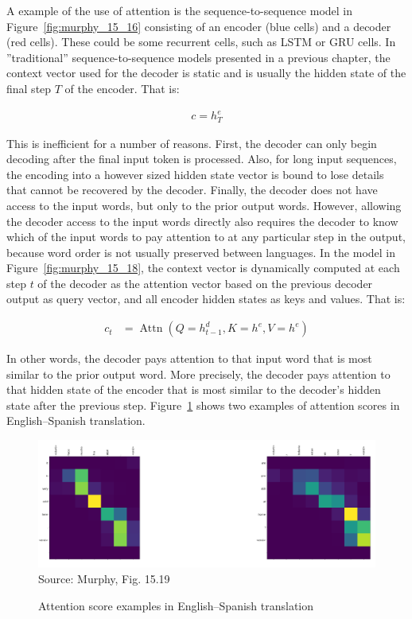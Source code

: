 A example of the use of attention is the sequence-to-sequence model in Figure~\ref{fig:murphy_15_16} consisting of an encoder (blue cells) and a decoder (red cells). These could be some recurrent cells, such as LSTM or GRU cells. In ''traditional'' sequence-to-sequence models presented in a previous chapter, the context vector used for the decoder is static and is usually the hidden state of the final step $T$ of the encoder. That is:

\begin{align*}
c = h^e_T
\end{align*}

This is inefficient for a number of reasons. First, the decoder can only begin decoding after the final input token is processed. Also, for long input sequences, the encoding into a however sized hidden state vector is bound to lose details that cannot be recovered by the decoder. Finally, the decoder does not have access to the input words, but only to the prior output words. However, allowing the decoder access to the input words directly also requires the decoder to know which of the input words to pay attention to at any particular step in the output, because word order is not usually preserved between languages. In the model in Figure~\ref{fig:murphy_15_18}, the context vector is dynamically computed at each step $t$ of the decoder as the attention vector based on the previous decoder output as query vector, and all encoder hidden states as keys and values. That is:

\begin{align*}
c_t &= \operatorname{Attn}(Q = h_{t-1}^d, K = h^e, V = h^e)
\end{align*}

In other words, the decoder pays attention to that input word that is most similar to the prior output word. More precisely, the decoder pays attention to that hidden state of the encoder that is most similar to the decoder's hidden state after the previous step. Figure~\ref{fig:murphy_15_19} shows two examples of attention scores in English--Spanish translation. 

\begin{figure}
\begin{center}
\includegraphics[width=\textwidth]{murphy_15_19.png} \\

\scriptsize Source: Murphy, Fig. 15.19 \normalsize
\end{center}
\caption{Attention score examples in English--Spanish translation}
\label{fig:murphy_15_19}
\end{figure}


